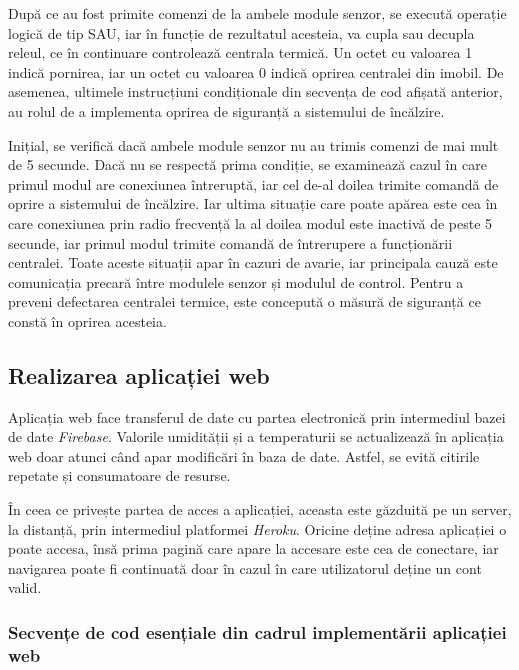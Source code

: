 	După ce au fost primite comenzi de la ambele module senzor, se execută operație logică de tip SAU, iar în funcție de rezultatul acesteia, va cupla sau decupla releul, ce în continuare controlează centrala termică. Un octet cu valoarea 1 indică pornirea, iar un octet cu valoarea 0 indică oprirea centralei din imobil. De asemenea, ultimele instrucțiuni condiționale din secvența de cod afișată anterior, au rolul de a implementa oprirea de siguranță a sistemului de încălzire. 

	Inițial, se verifică dacă ambele module senzor nu au trimis comenzi de mai mult de 5 secunde. Dacă nu se respectă prima condiție, se examinează cazul în care primul modul are conexiunea întreruptă, iar cel de-al doilea trimite comandă de oprire a sistemului de încălzire. Iar ultima situație care poate apărea este cea în care conexiunea prin radio frecvență la al doilea modul este inactivă de peste 5 secunde, iar primul modul trimite comandă de întrerupere a funcționării centralei. Toate aceste situații apar în cazuri de avarie, iar principala cauză este comunicația precară între modulele senzor și modulul de control. Pentru a preveni defectarea centralei termice, este concepută o măsură de siguranță ce constă în oprirea acesteia.  

\subsection{Realizarea aplicației web}

	Aplicația web face transferul de date cu partea electronică prin intermediul bazei de date \textit{Firebase}. Valorile umidității și a temperaturii se actualizează în aplicația web doar atunci când apar modificări în baza de date. Astfel, se evită citirile repetate și consumatoare de resurse.
	
	În ceea ce privește partea de acces a aplicației, aceasta este găzduită pe un server, la distanță, prin intermediul platformei \textit{Heroku}. Oricine deține adresa aplicației o poate accesa, însă prima pagină care apare la accesare este cea de conectare, iar navigarea poate fi continuată doar în cazul în care utilizatorul deține un cont valid. 
	
\vspace{1em}

\subsubsection{Secvențe de cod esențiale din cadrul implementării aplicației web}

